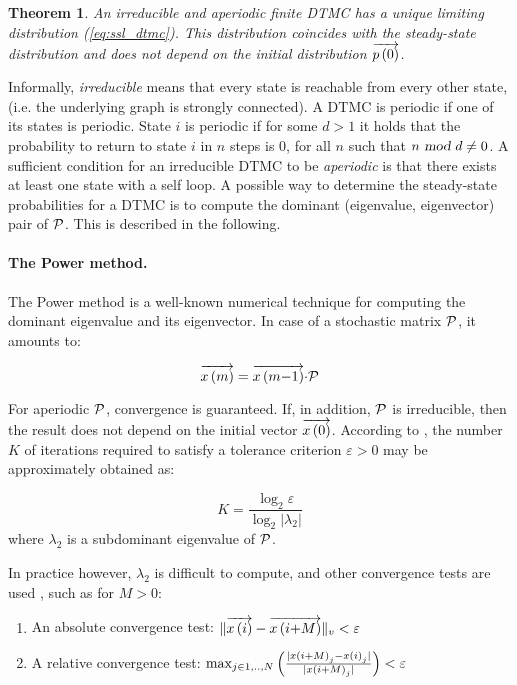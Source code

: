 \documentclass[times, 10pt,twocolumn]{article}
\newtheorem{theorem}{Theorem}
\begin{document}
		\begin{theorem}
			\cite{Haverkort_98} An irreducible and aperiodic finite DTMC has a unique limiting distribution (\ref{eq:ssl_dtmc}).  This distribution coincides with the steady-state distribution and does not depend on the initial distribution $\overrightarrow{p \left( 0 \right)}$.
		\end{theorem}
		
		Informally, \emph{irreducible} means that every state is reachable from every other state, (i.e. the underlying graph is strongly connected).  A DTMC is periodic if one of its states is periodic.  State $i$ is periodic if for some $d > 1$ it holds that the probability to return to state $i$ in $n$ steps is 0, for all $n$ such that $n \mbox{ \sl mod } d \neq 0$.  A sufficient condition for an irreducible DTMC to be \emph{aperiodic} is that there exists at least one state with a self loop. A possible way to determine the steady-state probabilities for a DTMC is to compute the dominant (eigenvalue, eigenvector) pair of $\mathcal{P}$.  This is described in the following.
		
		\paragraph{The Power method. \label{sss:power_method}}
		The Power method \cite{Stewart_94} is a well-known numerical technique for computing the dominant eigenvalue and its eigenvector.
		In case of a stochastic matrix $\mathcal{P}$, it amounts to:

		\begin{equation}
			\overrightarrow{x\left(m\right)} = \overrightarrow{x\left(m{-}1\right)}{\cdot}\mathcal{P} \nonumber
		\end{equation}

		For aperiodic $\mathcal{P}$, convergence is guaranteed.  If, in addition, $\mathcal{P}$ is irreducible, then the result does not depend on the initial vector $\overrightarrow{x\left(0\right)}$.
		According to \cite{Stewart_94}, the number $K$ of iterations required to satisfy a tolerance criterion $\varepsilon > 0$ may be approximately obtained as:
	
		\begin{equation}
			K = \dfrac{\log_{2} \varepsilon}{\log_{2} | \lambda_{2} |} \nonumber
		\end{equation}
		where $\lambda_{2}$ is a subdominant eigenvalue of $\mathcal{P}$.

		In practice however, $ \lambda_{2}$ is difficult to compute, and other convergence tests are used \cite{Stewart_94}, such as for $M > 0$:
		\begin{enumerate}
			\item An absolute convergence test: $\lVert \overrightarrow{x\left(i\right)} - \overrightarrow{x\left(i{+}M\right)} \rVert_{v} < \varepsilon$
			\item A relative convergence test: $\max_{j \in 1,..,N} \left( \frac{ | x\left(i{+}M\right)_{j} - x\left(i\right)_{j} |}{ | x\left(i{+}M\right)_{j} |} \right) < \varepsilon$
		\end{enumerate}
\end{document}
